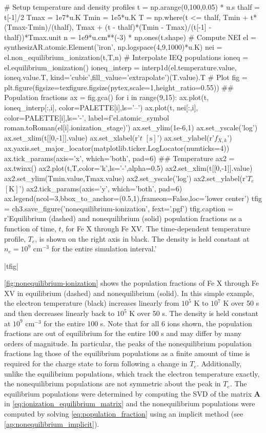 \begin{pycode}[chapter3]
# Setup temperature and density profiles
t = np.arange(0,100,0.05) * u.s
thalf = t[-1]/2
Tmax = 1e7*u.K
Tmin = 1e5*u.K
T = np.where(t <= thalf, Tmin + t*(Tmax-Tmin)/(thalf),
             Tmax + (t - thalf)*(Tmin - Tmax)/(t[-1] - thalf))*Tmax.unit
n = 1e9*u.cm**(-3) * np.ones(t.shape)
# Compute NEI
el = synthesizAR.atomic.Element('iron', np.logspace(4,9,1000)*u.K)
nei = el.non_equilibrium_ionization(t,T,n)
# Interpolate IEQ populations
ioneq = el.equilibrium_ionization()
ioneq_interp = interp1d(el.temperature.value, ioneq.value.T, 
                        kind='cubic',fill_value='extrapolate')(T.value).T
# Plot
fig = plt.figure(figsize=texfigure.figsize(pytex,scale=1,height_ratio=0.55))
## Population fractions
ax = fig.gca()
for i in range(9,15):
    ax.plot(t, ioneq_interp[:,i], color=PALETTE[i],ls='--')
    ax.plot(t, nei[:,i], color=PALETTE[i],ls='-',
            label=f'{el.atomic_symbol} {roman.toRoman(el[i].ionization_stage)}')
ax.set_ylim(1e-6,1)
ax.set_yscale('log')
ax.set_xlim(t[[0,-1]].value)
ax.set_xlabel(r'$t$ $[\si{\second}]$')
ax.set_ylabel(r'$f_{X,k}$')
ax.yaxis.set_major_locator(matplotlib.ticker.LogLocator(numticks=4))
ax.tick_params(axis='x', which='both', pad=6)
## Temperature
ax2 = ax.twinx()
ax2.plot(t,T,color='k',ls='-',alpha=0.5)
ax2.set_xlim(t[[0,-1]].value)
ax2.set_ylim(Tmin.value,Tmax.value)
ax2.set_yscale('log')
ax2.set_ylabel(r'$T_e$ $[\si{\kelvin}]$')
ax2.tick_params(axis='y', which='both', pad=6)
ax.legend(ncol=3,bbox_to_anchor=(0.5,1),frameon=False,loc='lower center')
tfig = ch3.save_figure('nonequilibrium-ionization', fext='.pgf')
tfig.caption = r'Equilibrium (dashed) and nonequilibrium (solid) population fractions as a function of time, $t$, for Fe X through Fe XV. The time-dependent temperature profile, $T_e$, is shown on the right axis in black. The density is held constant at $n_e=10^9$ $\si{\cm}^{-3}$ for the entire simulation interval.'
\end{pycode}
\py[chapter3]|tfig|

\autoref{fig:nonequilibrium-ionization} shows the population fractions of Fe X through Fe XV in equilibrium (dashed) and nonequilibrium (solid). In this simple example, the electron temperature (black) increases linearly from $10^5$ K to $10^7$ K over 50 s and then decreases linearly back to $10^5$ K over 50 s. The density is held constant at $10^9$ cm$^{-3}$ for the entire 100 s. Note that for all 6 ions shown, the population fractions are out of equilibrium for the entire 100 s and may differ by many orders of magnitude. In particular, the peaks of the nonequilibrium population fractions lag those of the equilibrium populations as a finite amount of time is required for the charge state to form following a change in $T_e$. Additionally, unlike the equilibrium populations, which track the electron temperature exactly, the nonequilibrium populations are not symmetric about the peak in $T_e$. The equilibrium populations were determined by computing the SVD of the matrix $\mathbf{A}$ in \autoref{eq:ionization_equilibrium_matrix} and the nonequilibrium populations were computed by solving \autoref{eq:population_fraction} using an implicit method (see \autoref{ap:nonequilibrium_implicit}).

